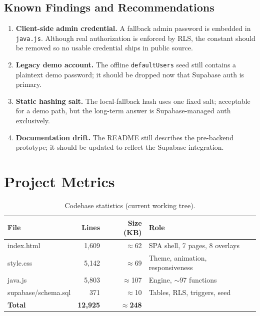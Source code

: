 \documentclass[11pt,a4paper]{article}
\begin{document}
\subsection{Known Findings and Recommendations}

\begin{enumerate}[nosep]
    \item \textbf{Client-side admin credential.} A fallback admin password
          is embedded in \texttt{java.js}. Although real authorization is
          enforced by RLS, the constant should be removed so no usable
          credential ships in public source.
    \item \textbf{Legacy demo account.} The offline \texttt{defaultUsers}
          seed still contains a plaintext demo password; it should be
          dropped now that Supabase auth is primary.
    \item \textbf{Static hashing salt.} The local-fallback hash uses one
          fixed salt; acceptable for a demo path, but the long-term answer
          is Supabase-managed auth exclusively.
    \item \textbf{Documentation drift.} The README still describes the
          pre-backend prototype; it should be updated to reflect the
          Supabase integration.
\end{enumerate}


\section{Project Metrics}

\begin{table}[h!]
\centering
\caption{Codebase statistics (current working tree).}
\begin{tabular}{@{}lrrl@{}}
\toprule
\textbf{File} & \textbf{Lines} & \textbf{Size (KB)} & \textbf{Role} \\
\midrule
index.html            & 1{,}609 & $\approx$62  & SPA shell, 7 pages, 8 overlays \\
style.css             & 5{,}142 & $\approx$69  & Theme, animation, responsiveness \\
java.js               & 5{,}803 & $\approx$107 & Engine, $\sim$97 functions \\
supabase/schema.sql   & 371     & $\approx$10  & Tables, RLS, triggers, seed \\
\midrule
\textbf{Total}        & \textbf{12{,}925} & $\approx$\textbf{248} & \\
\bottomrule
\end{tabular}
\end{table}
\end{document}
